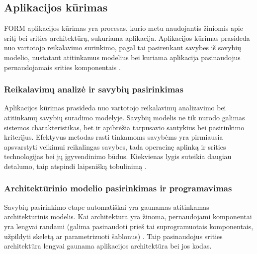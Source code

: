 \documentclass{VUMIFPSbakalaurinis}
\begin{document}
\subsection{Aplikacijos kūrimas}

FORM aplikacijos kūrimas yra procesas, kurio metu naudojantis žiniomis apie sritį bei srities architektūrą, sukuriama aplikacija. Aplikacijos kūrimas prasideda nuo vartotojo reikalavimo surinkimo, pagal tai pasirenkant savybes iš savybių modelio, nustatant atitinkamus modelius bei kuriama aplikacija pasinaudojus pernaudojamais srities komponentais \cite{Kang}.

\subsubsection{Reikalavimų analizė ir savybių pasirinkimas}


Aplikacijos kūrimas prasideda nuo vartotojo reikalavimų analizavimo bei atitinkamų savybių suradimo modelyje. Savybių modelis ne tik nurodo galimas sistemos charakteristikas, bet ir apibrėžia tarpusavio santykius bei pasirinkimo kriterijus. Efektyvus metodas rasti tinkamoms savybėms yra pirmiausia apsvarstyti veikimui reikalingas savybes, tada operacinę aplinką ir srities technologijas bei jų įgyvendinimo būdus. Kiekvienas lygis suteikia daugiau detalumo, taip atspindi laipsnišką tobulinimą \cite{Kang}.


\subsubsection{Architektūrinio modelio pasirinkimas ir programavimas}

Savybių pasirinkimo etape automatiškai yra gaunamas atitinkamas architektūrinis modelis. Kai architektūra yra žinoma, pernaudojami komponentai yra lengvai randami (galima pasinaudoti prieš tai suprogramuotais komponentais, užpildyti skeletą ar parametrizuoti šablonus) \cite{Kang}. Taip pasinaudojus srities architektūra lengvai gaunama aplikacijos architektūra bei jos kodas.
\end{document}
